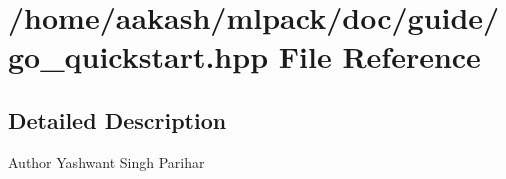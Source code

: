 \section{/home/aakash/mlpack/doc/guide/go\+\_\+quickstart.hpp File Reference}
\label{go__quickstart_8hpp}


\subsection{Detailed Description}
\begin{DoxyAuthor}{Author}
Yashwant Singh Parihar 
\end{DoxyAuthor}
